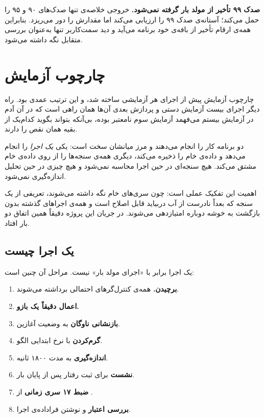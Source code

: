 \textbf{صدک ۹۹ تأخیر از مولد بار گرفته نمی‌شود.} خروجی خلاصه‌ی  تنها صدک‌های ۹۰ و ۹۵ را
حمل می‌کند؛ آستانه‌ی صدک ۹۹ را ارزیابی می‌کند اما مقدارش را دور می‌ریزد. بنابراین همه‌ی
ارقام تأخیر از بافه‌ی خود برنامه می‌آید و دید سمت‌کاربر  تنها به‌عنوان بررسی متقابل
نگه داشته می‌شود.

\section{چارچوب آزمایش}
\label{sec:method-harness}

چارچوب آزمایش پیش از اجرای هر آزمایشی ساخته شد، و این ترتیب عمدی بود. راه دیگر \mdash{} اجرای بیست
آزمایش دستی و پردازش بعدی آن‌ها \mdash{} همان راهی است که در آن آدم در آزمایش بیستم می‌فهمد آزمایش
سوم نامعتبر بوده، بی‌آنکه بتواند بگوید کدام‌یک از بقیه همان نقص را دارند.

دو برنامه کار را انجام می‌دهند و مرز میانشان سخت است: یکی \emph{یک اجرا} را انجام می‌دهد و
داده‌ی خام را ذخیره می‌کند، دیگری همه‌ی سنجه‌ها را از روی داده‌ی خام \emph{مشتق} می‌کند.
هیچ سنجه‌ای در حین اجرا محاسبه نمی‌شود و هیچ چیزی در حین تحلیل اندازه‌گیری نمی‌شود.

اهمیت این تفکیک عملی است: چون سری‌های خام نگه داشته می‌شوند، تعریفی از یک سنجه که بعداً
نادرست از آب دربیاید قابل اصلاح است و همه‌ی اجراهای گذشته بدون بازگشت به خوشه دوباره
امتیازدهی می‌شوند. در جریان این پروژه دقیقاً همین اتفاق دو بار افتاد.

\subsection{یک اجرا چیست}
\label{sec:method-run}

یک اجرا برابر با «اجرای مولد بار» نیست. مراحل آن چنین است:

\begin{enumerate}
  \item \textbf{برچیدن.} همه‌ی کنترل‌گرهای احتمالی برداشته می‌شوند.
  \item \textbf{اعمال دقیقاً یک بازو.}
  \item \textbf{بازنشانی ناوگان} به وضعیت آغازین.
  \item \textbf{گرم‌کردن} با نرخ ابتدایی الگو.
  \item \textbf{اندازه‌گیری} به مدت ۱۸۰۰ ثانیه.
  \item \textbf{نشست} برای ثبت رفتار پس از پایان بار.
  \item \textbf{ضبط ۱۷ سری زمانی} از .
  \item \textbf{بررسی اعتبار} و نوشتن فراداده‌ی اجرا.
\end{enumerate}

